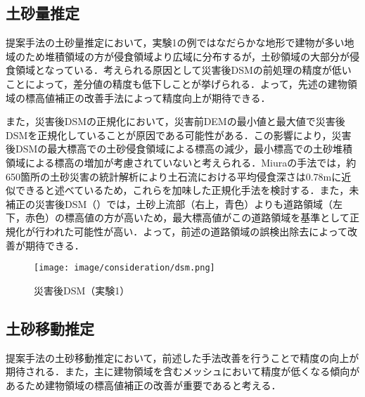     \subsection*{土砂量推定}
      提案手法の土砂量推定において，実験1の例ではなだらかな地形で建物が多い地域のため堆積領域の方が侵食領域より広域に分布するが，土砂領域の大部分が侵食領域となっている．考えられる原因として災害後DSMの前処理の精度が低いことによって，差分値の精度も低下しことが挙げられる．よって，先述の建物領域の標高値補正の改善手法によって精度向上が期待できる．
      
      また，災害後DSMの正規化において，災害前DEMの最小値と最大値で災害後DSMを正規化していることが原因である可能性がある．この影響により，災害後DSMの最大標高での土砂侵食領域による標高の減少，最小標高での土砂堆積領域による標高の増加が考慮されていないと考えられる．Miuraの手法\cite{土砂量解析5}では，約650箇所の土砂災害の統計解析により土石流における平均侵食深さは0.78mに近似できると述べているため，これらを加味した正規化手法を検討する．また，未補正の災害後DSM（）では，土砂上流部（右上，青色）よりも道路領域（左下，赤色）の標高値の方が高いため，最大標高値がこの道路領域を基準として正規化が行われた可能性が高い．よって，前述の道路領域の誤検出除去によって改善が期待できる．
      
      \begin{figure}[t]
        \centering
        \texttt{[image: image/consideration/dsm.png]}
        \caption{災害後DSM（実験1）}
        \label{災害後DSM（実験1）}
      \end{figure}


    \subsection*{土砂移動推定}
      提案手法の土砂移動推定において，前述した手法改善を行うことで精度の向上が期待される．また，主に建物領域を含むメッシュにおいて精度が低くなる傾向があるため建物領域の標高値補正の改善が重要であると考える．
